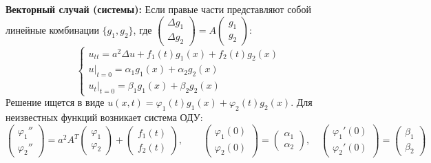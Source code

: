 \noindent\textbf{Векторный случай (системы):} Если правые части представляют собой линейные комбинации $\{g_1, g_2\}$, где $\begin{pmatrix} \Delta g_1 \\ \Delta g_2 \end{pmatrix} = A \begin{pmatrix} g_1 \\ g_2 \end{pmatrix}$:
\[
\begin{cases}
u_{tt} = a^2 \Delta u + f_1(t)g_1(x) + f_2(t)g_2(x) \\
u|_{t=0} = \alpha_1 g_1(x) + \alpha_2 g_2(x) \\
u_t|_{t=0} = \beta_1 g_1(x) + \beta_2 g_2(x)
\end{cases}
\]
Решение ищется в виде $u(x,t) = \varphi_1(t)g_1(x) + \varphi_2(t)g_2(x)$. Для неизвестных функций возникает система ОДУ: 
\[
\begin{pmatrix} \varphi_1'' \\ \varphi_2'' \end{pmatrix} = 
a^2 A^T \begin{pmatrix} \varphi_1 \\ \varphi_2 \end{pmatrix} + \begin{pmatrix} f_1(t) \\ f_2(t) \end{pmatrix}, \qquad
\begin{pmatrix} \varphi_1(0) \\ \varphi_2(0) \end{pmatrix} = \begin{pmatrix} \alpha_1 \\ \alpha_2 \end{pmatrix}, \quad
\begin{pmatrix} \varphi_1'(0) \\ \varphi_2'(0) \end{pmatrix} = \begin{pmatrix} \beta_1 \\ \beta_2 \end{pmatrix}
\]

